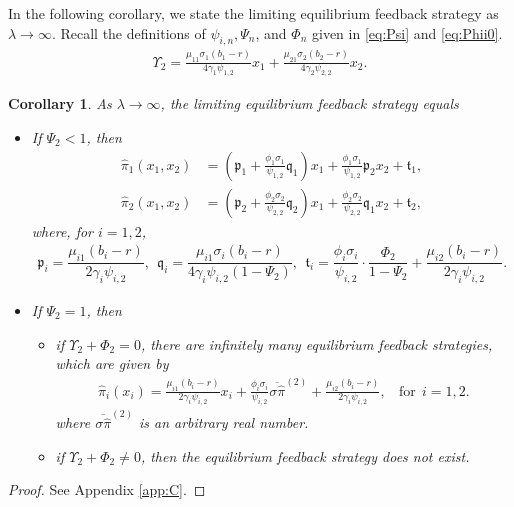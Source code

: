 \documentclass[11pt]{article}
\newtheorem{corollary}{Corollary}[section]
\newcommand \sig {\sigma}
\numberwithin{equation}{section}
\begin{document}
In the following corollary, we state the limiting equilibrium feedback strategy as \(\lambda\to \infty\). Recall the definitions of $\psi_{i,n}, \Psi_n$, and $\Phi_n$ given in \eqref{eq:Psi} and \eqref{eq:Phii0}.
\begin{align}\label{eq:Upsilon}
\Upsilon_2=\frac{\mu_{11}\sigma_1(b_1-r)}{4\gamma_1\psi_{1,2}}x_1 + \frac{\mu_{21}\sigma_2(b_2-r)}{4\gamma_2\psi_{2,2}}x_2.
\end{align}
	\begin{corollary}\label{coro:1.8}
		As \(\lambda\to \infty\), the limiting equilibrium feedback strategy equals
		\begin{itemize}
			\item[$(1)$] If \(\Psi_2 < 1\), then
             \begin{align}
				\widehat{\pi}_1(x_1, x_2)& = \left(\mathfrak{p}_1 + \frac{\phi_1\sigma_1}{\psi_{1,2}}\mathfrak{q}_1 \right) x_1 + \frac{\phi_1\sigma_1}{\psi_{1,2}}\mathfrak{p}_2 x_2 + \mathfrak{t}_1, \label{eq:pi1.8}\\
               \widehat{\pi}_2(x_1, x_2)& =\left(\mathfrak{p}_2 + \frac{\phi_2\sigma_2}{\psi_{2,2}}\mathfrak{q}_2\right) x_1 + \frac{\phi_2\sigma_2}{\psi_{2,2}}\mathfrak{q}_1 x_2 + \mathfrak{t}_2, \label{eq:pi2.8}
			\end{align}
where, for $i=1,2$,
\begin{align}
\mathfrak{p}_i = \dfrac{\mu_{i1}(b_i-r)}{2\gamma_i\psi_{i,2}}, ~~
\mathfrak{q}_i = \dfrac{\mu_{i1}\sig_i(b_i-r)}{4\gamma_i\psi_{i,2}(1 - \Psi_2) }, ~~
\mathfrak{t}_i =  \dfrac{\phi_i \sig_i}{\psi_{i,2}}\cdot \dfrac{\Phi_2}{1 - \Psi_2}  + \dfrac{\mu_{i2}(b_i-r)}{2\gamma_i\psi_{i,2}}.
\end{align}
	\item[$(2)$] If \(\Psi_2=1\), then
\begin{itemize}
\item[$(a)$] if \(\Upsilon_2+\Phi_2=0\), there are infinitely many equilibrium feedback strategies, which are given by
    \begin{align}\label{eq:picor1.80}
    \widehat{\pi}_i(x_i)=\frac{\mu_{i1}(b_i-r)}{2\gamma_i\psi_{i,2}}x_i+\frac{\phi_i\sigma_i}{\psi_{i,2}}\overline{\sigma\widehat{\pi}}^{(2)}+\frac{\mu_{i2}(b_i-r)}{2\gamma_i\psi_{i,2}},
    ~~~~\mbox{for}~~i=1,2.
    \end{align}
    where \(\overline{\sigma\widehat{\pi}}^{(2)}\) is an arbitrary real number.
 \item[$(b)$] if \(\Upsilon_2+\Phi_2\neq0\), then the equilibrium feedback strategy does not exist.
\end{itemize}
\end{itemize}
\end{corollary}
\begin{proof}
 See Appendix \ref {app:C}.
\end{proof}
\end{document}
